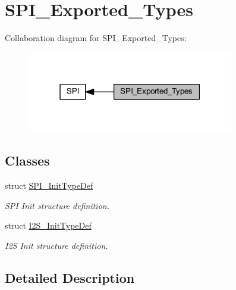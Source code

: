 \hypertarget{group___s_p_i___exported___types}{}\section{S\+P\+I\+\_\+\+Exported\+\_\+\+Types}
\label{group___s_p_i___exported___types}
Collaboration diagram for S\+P\+I\+\_\+\+Exported\+\_\+\+Types\+:
\nopagebreak
\begin{figure}[H]
\begin{center}
\leavevmode
\includegraphics[width=256pt]{group___s_p_i___exported___types}
\end{center}
\end{figure}
\subsection*{Classes}
\begin{DoxyCompactItemize}
\item 
struct \hyperlink{struct_s_p_i___init_type_def}{S\+P\+I\+\_\+\+Init\+Type\+Def}
\begin{DoxyCompactList}\small\item\em S\+PI Init structure definition. \end{DoxyCompactList}\item 
struct \hyperlink{struct_i2_s___init_type_def}{I2\+S\+\_\+\+Init\+Type\+Def}
\begin{DoxyCompactList}\small\item\em I2S Init structure definition. \end{DoxyCompactList}\end{DoxyCompactItemize}


\subsection{Detailed Description}
